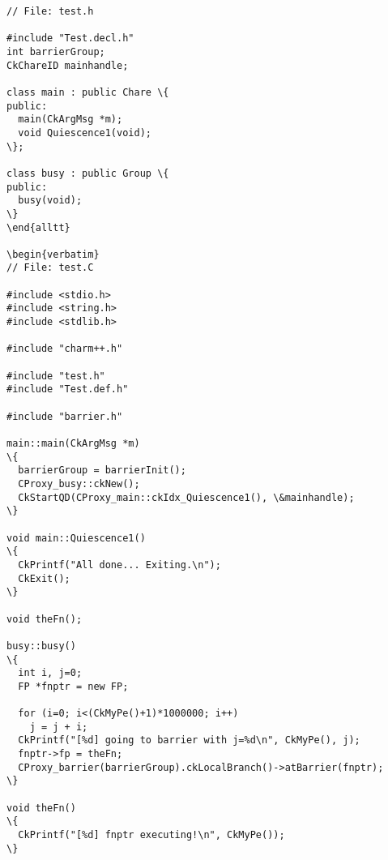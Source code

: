 \begin{verbatim}
// File: test.h

#include "Test.decl.h"
int barrierGroup;
CkChareID mainhandle;

class main : public Chare \{
public:
  main(CkArgMsg *m);
  void Quiescence1(void);
\};

class busy : public Group \{
public:
  busy(void);
\}
\end{alltt}

\begin{verbatim}
// File: test.C

#include <stdio.h>
#include <string.h>
#include <stdlib.h>

#include "charm++.h"

#include "test.h"
#include "Test.def.h"

#include "barrier.h"

main::main(CkArgMsg *m)
\{
  barrierGroup = barrierInit();
  CProxy_busy::ckNew();
  CkStartQD(CProxy_main::ckIdx_Quiescence1(), \&mainhandle);
\}

void main::Quiescence1() 
\{ 
  CkPrintf("All done... Exiting.\n");
  CkExit();
\}

void theFn();

busy::busy()
\{
  int i, j=0;
  FP *fnptr = new FP;

  for (i=0; i<(CkMyPe()+1)*1000000; i++)
    j = j + i;
  CkPrintf("[%d] going to barrier with j=%d\n", CkMyPe(), j);
  fnptr->fp = theFn;
  CProxy_barrier(barrierGroup).ckLocalBranch()->atBarrier(fnptr);
\}

void theFn()
\{
  CkPrintf("[%d] fnptr executing!\n", CkMyPe());
\}
\end{verbatim}
